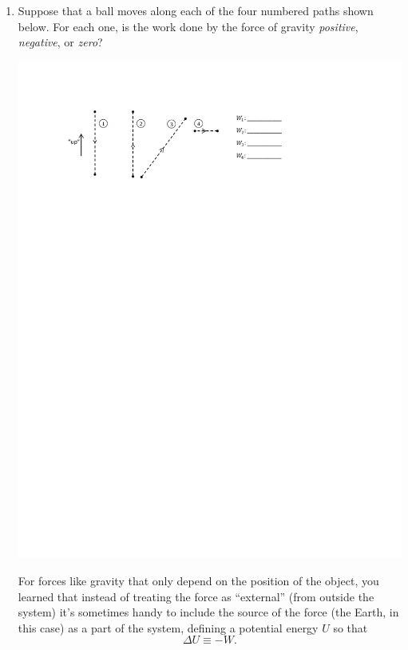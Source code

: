 \begin{enumerate}[labparts]

\item Suppose that a ball moves along each of the four numbered paths shown below.  For each one, is the work done by the force of gravity \textit{positive}, \textit{negative}, or \textit{zero}? \label{part_potential_intro_grav_work} 
\begin{center}
\vspace{0.1in}
\includegraphics{potential_intro/activity_1_figs/gravity_paths.pdf}
\vspace{0.1in}
\end{center}

For forces like gravity that only depend on the position of the object, you learned that instead of treating the force as  ``external'' (from outside the system) it's sometimes handy to include the source of the force (the Earth, in this case) as a part of the system, defining a potential energy $U$ so that
$$\Delta U \equiv -W.$$


\end{enumerate}
